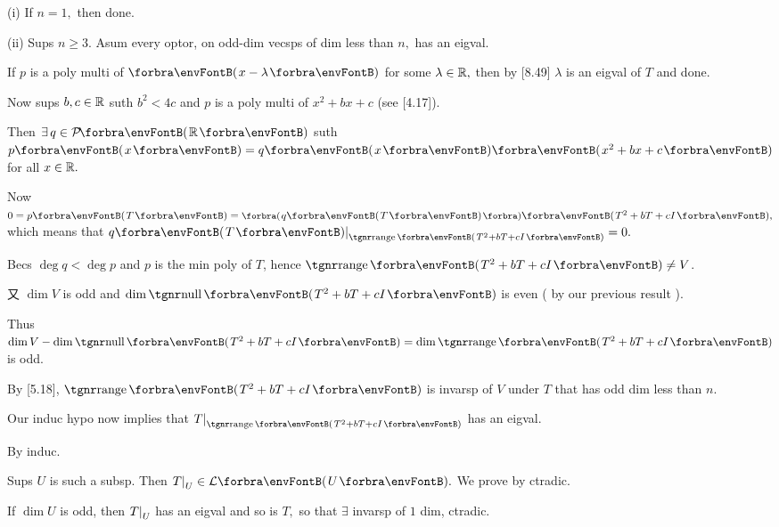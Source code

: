 \par\quad
(i) If $n=1,$ then done.\par\quad\Endi
(ii) Sups $n\geqslant 3.$ Asum every optor, on odd-dim vecsps of dim less than $n,$ has an eigval.\par\quad\Hii
If $p$ is a poly multi of $\Par{x - \lambda}$ for some $\lambda\in{\mathbb{R}},$ then by [8.49] $\lambda$ is an eigval of $T$ and done.\par\quad\Hii
Now sups $b, c\in{\mathbb{R}}$ suth $b^2 < 4c$ and $p$ is a poly multi of $x^2 + bx + c$ (see [4.17]).\par\quad\Hii
Then $\exists\,q\in\PoRi$ suth $p\Par{x} = q\Par{x}\Par{x^2 + bx + c}$ for all $x\in{\mathbb{R}}.$\par\quad\Hii
Now $0 = p\Par{T} = \BigPar{q\Par{T}}\Par{T^2 + bT + cI},$ which means that $q\Par{T}\mmid_{\range\Par{T^2+bT+cI}}=0.$\par\quad\Hii
Becs $\deg q < \deg p$ and $p$ is the min poly of $T$, hence $\range\Par{T^2 + bT + cI}\neq V$.\par\quad\Hii
又 $\dim V$ is odd and $\dim\null\Par{T^2 +bT+cI}$ is even ( by our previous result ).\par\quad\Hii
Thus $\dim V - \dim \null\Par{T^2 + bT + cI}=\dim \range\Par{T^2 + bT + cI}$ is odd.\par\quad\Hii
By [5.18], $\range\Par{T^2 + bT + cI}$ is invarsp of $V$ under $T$ that has odd dim less than $n.$\par\quad\Hii
Our induc hypo now implies that $T\mmid_{\range\Par{T^2 + bT + cI}}$ has an eigval.\par\quad
By induc.\PfEnd
\SepLine

\par\quad
Sups $U$ is such a subsp. Then $T\mmid_U\in\Lm{U}.$
We prove by ctradic.\par\quad
If $\dim U$ is odd, then $T\text{\normalsize|}_U$ has an eigval and so is $T,$ so that $\exists$ invarsp of $1$ dim, ctradic.\PfEnd
\SepLine

